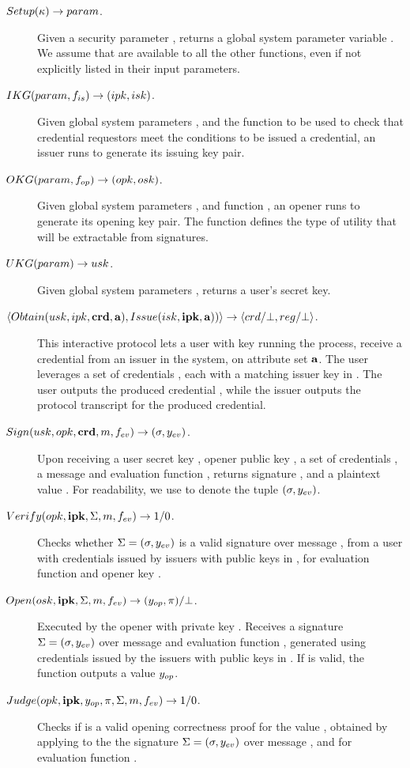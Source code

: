 \begin{description}
\item[$Setup(\kappa) \rightarrow param$.] Given a security parameter \secpar,
  returns a global system parameter variable \parm. We assume that \parm are
  available to all the other functions, even if not explicitly listed in their
  input parameters.
\item[$IKG(param,f_{is}) \rightarrow (ipk,isk)$.] Given global system
  parameters \parm, and the function \fissue to be used to check that credential
  requestors meet the conditions to be issued a credential, an issuer runs
  \IKeyGen to generate its issuing key pair. 
\item[$OKG(param,f_{op}) \rightarrow (opk,osk)$.] Given global system
  parameters \parm, and function \finsp, an opener runs \OKeyGen to generate
  its opening key pair. The function \finsp defines the type of utility that
  will be extractable from signatures.
\item[$UKG(param) \rightarrow usk$.] Given global system parameters
  \parm, returns a user's secret key.
\item[$\langle
  Obtain(usk,ipk,\mathbf{crd},\mathbf{a}),
  Issue(isk,\mathbf{ipk},\mathbf{a}))
  \rangle \rightarrow \langle crd/\bot,reg/\bot \rangle$.] %
  This interactive protocol lets a user with key \usk running the
  \Obtain process, receive a credential \cred from an issuer in the system, on
  attribute set $\mathbf{a}$. The user leverages a set of credentials \scred,
  each with a matching issuer key in \sipk.
  The user outputs the produced credential \cred, while
  the issuer outputs the protocol transcript \utrans for the produced
  credential.
\item[$Sign(usk,opk,\mathbf{crd},m,f_{ev}) \rightarrow (\sigma,y_{ev})$.] %
  Upon receiving a user secret key \usk, opener public key \opk, a set of
  credentials \scred, a message \msg and evaluation
  function \feval, returns signature \sig, and a plaintext value \yeval. For
  readability, we use \Sig to denote the tuple $(\sigma,y_{ev})$.
\item[$Verify(opk, \mathbf{ipk},\Sigma,m,f_{ev}) \rightarrow 1/0$.]
  Checks whether $\Sigma = (\sigma,y_{ev})$ is a valid signature
  over message \msg, from a user with credentials issued by issuers with public
  keys in \sipk, for evaluation function \feval and opener key \opk.
\item[$Open(osk,\mathbf{ipk},\Sigma,m,f_{ev}) \rightarrow
  (y_{op},\pi)/\bot$.]
  Executed by the opener with private key \osk. Receives a signature $\Sigma=
  (\sigma,y_{ev})$ over message \msg and evaluation function \feval,
  generated using credentials issued by the issuers with public keys in \sipk.
  If \Sig is valid, the function outputs a value $y_{op}$.
\item[$Judge(opk,\mathbf{ipk},y_{op},\pi,\Sigma,m,f_{ev}) \rightarrow 1/0$.] %
  Checks if \iproof is a valid opening correctness proof for the value \yinsp,
  obtained by applying \Open to the the signature $\Sigma = (\sigma,y_{ev})$
  over message \msg, and for evaluation function \feval. 
\end{description}

